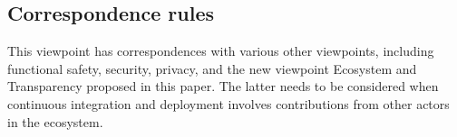 \subsection{Correspondence rules}\label{CID-CRs}

{This viewpoint has correspondences with various other viewpoints, including functional safety, security, privacy, and the new viewpoint Ecosystem and Transparency proposed in this paper. 
The latter needs to be considered when continuous integration and deployment involves contributions from other actors in the ecosystem.} 












